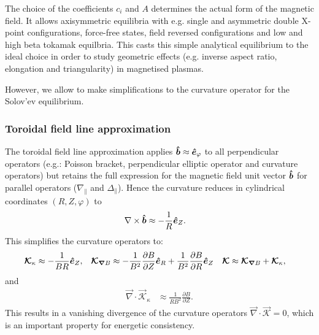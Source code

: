 The choice of the coefficients \(c_{i}\) and \(A\) determines the actual form of the magnetic field. It allows axisymmetric equilibria with e.g. single and asymmetric double X-point configurations, force-free states,
field reversed configurations and low and high beta tokamak equilbria. This casts this simple analytical equilibrium to the ideal choice in order to study geometric effects (e.g. inverse aspect ratio, elongation and triangularity) in magnetised plasmas.

However, we allow to make simplifications to the curvature operator
for the Solov'ev equilibrium.

\subsubsection{Toroidal field line approximation}\label{sec:torfieldlineapprox}
The toroidal field line approximation applies \(\bm{\hat{b}}\approx \bm{\hat{e}}_\varphi\) to all perpendicular operators (e.g.: Poisson bracket, perpendicular elliptic operator and curvature operators)
but retains the full expression for the magnetic field unit vector \(\bm{\hat{b}}\)
for parallel operators (\(\nabla_\parallel\) and \(\Delta_\parallel\)).
Hence the curvature reduces in cylindrical coordinates \((R,Z,\varphi)\) to
\begin{align}\label{eq:kappalowbeta}
 \nabla\times\bm{\hat{b}} &\approx -  \frac{1}{R} \bm{\hat{e}}_Z.
\end{align}
This simplifies the curvature operators to:
\begin{align}
{\boldsymbol{\mathcal{K}}}_{\kappa}  &\approx  -  \frac{1}{B R} \bm{\hat{e}}_Z , &
{\boldsymbol{ \mathcal{K} }}_{{\boldsymbol{\nabla}}  B}  &\approx  -\frac{1}{B^2}\frac{\partial B}{\partial Z}\bm{\hat{e}}_R +\frac{1}{B^2} \frac{\partial B}{\partial R}\bm{\hat{e}}_Z &
{\boldsymbol{ \mathcal{K} }} &\approx {\boldsymbol{ \mathcal{K} }}_{{\boldsymbol{\nabla}}  B}  +{\boldsymbol{ \mathcal{K} }}_{\kappa} ,
\end{align}
and
\begin{align}
 \vec{\nabla} \cdot \vec{\mathcal{K}}_{\kappa} &\approx \frac{1}{R B^2} \frac{\partial B}{\partial Z}.
\end{align}
This results in a vanishing divergence of the curvature operators \( \vec{\nabla} \cdot \vec{ \mathcal{K} } = 0\), which is an important property for energetic consistency.

